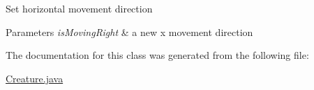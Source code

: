 Set horizontal movement direction 
\begin{DoxyParams}{Parameters}
{\em is\+Moving\+Right} & a new x movement direction \\
\hline
\end{DoxyParams}


The documentation for this class was generated from the following file\+:\begin{DoxyCompactItemize}
\item 
\mbox{\hyperlink{_creature_8java}{Creature.\+java}}\end{DoxyCompactItemize}
